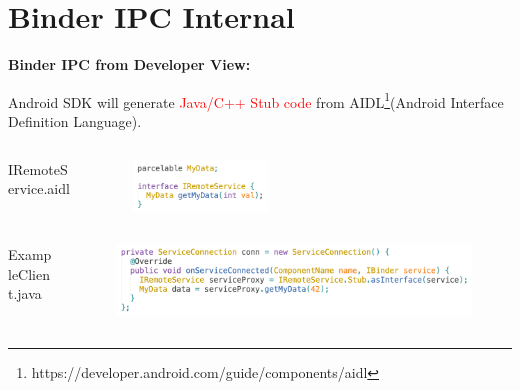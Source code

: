 \documentclass[notheorems, aspectratio=54]{beamer}
\begin{document}
\section{Binder IPC Internal}

\begin{frame}
	
	\textbf{Binder IPC from Developer View:} 
	
	Android SDK will generate \textcolor{red}{Java/C++ Stub code} from AIDL\footnote{\tiny{https://developer.android.com/guide/components/aidl}}(Android Interface Definition Language).
	
	\begin{columns}
		\begin{column}{0.2\textwidth}
			\scriptsize{IRemoteService.aidl}
		\end{column}
		\begin{column}{0.7\textwidth}
			\begin{figure}
				\begin{flushleft}
					\includegraphics[width=0.40\textwidth]{res/aidl-example.png}
				\end{flushleft}
			\end{figure}
		\end{column}
	\end{columns}
	
	\begin{columns}
		\begin{column}{0.2\textwidth}
			\scriptsize{ExampleClient.java}
		\end{column}
		\begin{column}{0.7\textwidth}
			\begin{figure}
				\begin{flushleft}
				\includegraphics[width=\textwidth]{res/aidl-example-client.png}
				\end{flushleft}
			\end{figure}
		\end{column}
	\end{columns}


\end{frame}
\end{document}
